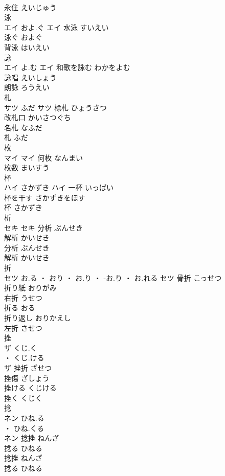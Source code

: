 \documentclass[8pt]{extreport}
\begin{document}
\begin{CJK}{UTF8}{min}
\\	永住	えいじゅう	
\\	泳	
\\	エイ	およ.ぐ	エイ	水泳	すいえい	
\\	泳ぐ	およぐ	
\\	背泳	はいえい	
\\	詠	
\\	エイ	よ.む	エイ	和歌を詠む	わかをよむ	
\\	詠唱	えいしょう	
\\	朗詠	ろうえい	
\\	札	
\\	サツ	ふだ	サツ	標札	ひょうさつ	
\\	改札口	かいさつぐち	
\\	名札	なふだ	
\\	札	ふだ	
\\	枚	
\\	マイ		マイ	何枚	なんまい	
\\	枚数	まいすう	
\\	杯	
\\	ハイ	さかずき	ハイ	一杯	いっぱい	
\\	杯を干す	さかずきをほす	
\\	杯	さかずき	
\\	析	
\\	セキ		セキ	分析	ぶんせき	
\\	解析	かいせき	
\\	分析	ぶんせき	
\\	解析	かいせき	
\\	折	
\\	セツ	お.る ・ おり ・ お.り ・ -お.り ・ お.れる	セツ	骨折	こっせつ	
\\	折り紙	おりがみ	
\\	右折	うせつ	
\\	折る	おる	
\\	折り返し	おりかえし	
\\	左折	させつ	
\\	挫	
\\	ザ	くじ.く
\\	・ くじ.ける
\\	ザ	挫折	ざせつ	
\\	挫傷	ざしょう	
\\	挫ける	くじける	
\\	挫く	くじく	
\\	捻	
\\	ネン	ひね.る
\\	・ ひね.くる
\\	ネン	捻挫	ねんざ	
\\	捻る	ひねる	
\\	捻挫	ねんざ	
\\	捻る	ひねる	
\end{CJK}
\end{document}
